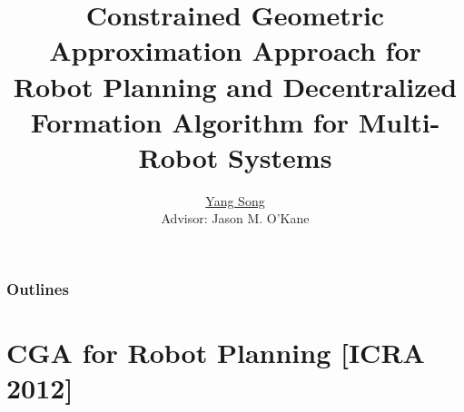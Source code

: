 \documentclass[10pt]{beamer}
\title[Ph.D. Proposal]{Constrained Geometric Approximation Approach for Robot Planning and  Decentralized Formation Algorithm for Multi-Robot Systems}
\author[Yang Song]{
  \underline{Yang Song}\\
  Advisor: Jason M. O'Kane %
}
\institute[
USC
] %
{ %
  Dept. of Computer Science and Engineering\\
  University of South Carolina
  
}
\begin{document}
\begin{frame}[plain] %
  \titlepage
\end{frame}
\begin{frame}
  \frametitle{Outlines}
  \tableofcontents[]
\end{frame}
\section{CGA for Robot Planning [ICRA 2012]}
\end{document}
